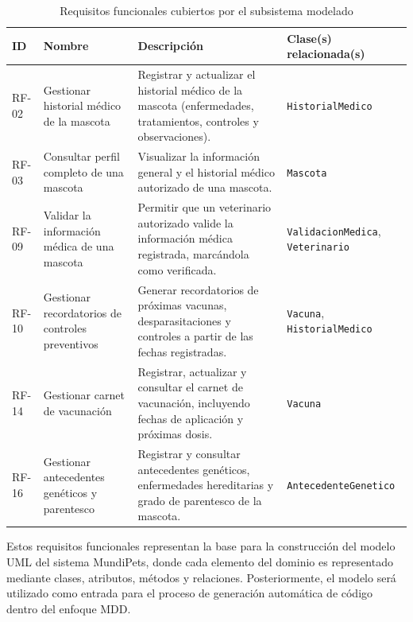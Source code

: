 \documentclass[10pt,a4paper,openany]{report}
\renewcommand{\arraystretch}{1.15}
\begin{document}
	\begin{table}[H]
		\centering
		\caption{Requisitos funcionales cubiertos por el subsistema modelado}
		\label{tab:rf-subsistema}
		\small
		\renewcommand{\arraystretch}{1.2}
		
		\begin{tabularx}{\textwidth}{|p{1.3cm}|p{3.1cm}|Y|p{2.6cm}|}
			\hline
			\textbf{ID} & \textbf{Nombre} & \textbf{Descripción} & \textbf{Clase(s) relacionada(s)} \\
			\hline
			
			RF-02 & Gestionar historial médico de la mascota &
			Registrar y actualizar el historial médico de la mascota
			(enfermedades, tratamientos, controles y observaciones). &
			\texttt{Historial\-Medico} \\
			\hline
			
			RF-03 & Consultar perfil completo de una mascota &
			Visualizar la información general y el historial médico
			autorizado de una mascota. &
			\texttt{Mascota} \\
			\hline
			
			RF-09 & Validar la información médica de una mascota &
			Permitir que un veterinario autorizado valide la información
			médica registrada, marcándola como verificada. &
			\texttt{Validacion\-Medica},
			\texttt{Veterinario} \\
			\hline
			
			RF-10 & Gestionar recordatorios de controles preventivos &
			Generar recordatorios de próximas vacunas, desparasitaciones
			y controles a partir de las fechas registradas. &
			\texttt{Vacuna},
			\texttt{Historial\-Medico} \\
			\hline
			
			RF-14 & Gestionar carnet de vacunación &
			Registrar, actualizar y consultar el carnet de vacunación,
			incluyendo fechas de aplicación y próximas dosis. &
			\texttt{Vacuna} \\
			\hline
			
			RF-16 & Gestionar antecedentes genéticos y parentesco &
			Registrar y consultar antecedentes genéticos, enfermedades
			hereditarias y grado de parentesco de la mascota. &
			\texttt{Antecedente\-Genetico} \\
			\hline
			
		\end{tabularx}
	\end{table}
	

	Estos requisitos funcionales representan la base para la construcción del modelo UML
	del sistema MundiPets, donde cada elemento del dominio es representado mediante
	clases, atributos, métodos y relaciones. Posteriormente, el modelo será utilizado como
	entrada para el proceso de generación automática de código dentro del enfoque MDD.
	
\end{document}
